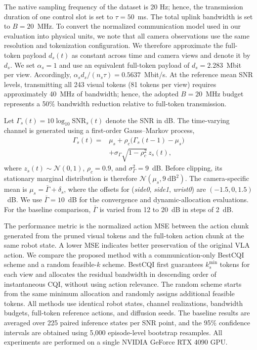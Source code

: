 \documentclass[lettersize,journal]{IEEEtran}
\theoremstyle{custom}
\begin{document}
The native sampling frequency of the dataset is 20 Hz; hence, the
transmission duration of one control slot is set to $\tau=50$~ms.
The total uplink bandwidth is set to $B=20$~MHz. To convert the normalized communication model used in our evaluation
into physical units, we note that all camera observations use the same
resolution and tokenization configuration. We therefore approximate
the full-token payload $d_s(t)$ as constant across time and camera
views and denote it by $d_s$. We set $\alpha_s=1$ and use an equivalent
full-token payload of $d_s=2.283$~Mbit per view. Accordingly,
$\alpha_s d_s/(n_s\tau)=0.5637$~Mbit/s. At the reference mean SNR
levels, transmitting all 243 visual tokens (81 tokens per view)
requires approximately 40~MHz of bandwidth; hence, the adopted
$B=20$~MHz budget represents a 50\% bandwidth reduction relative to
full-token transmission.

Let $\Gamma_s(t)=10\log_{10}\mathrm{SNR}_s(t)$ denote the SNR in dB.
The time-varying channel is generated using a first-order Gauss--Markov
process,
\begin{align}
\Gamma_s(t)
={}&\mu_s+\rho_c\bigl(\Gamma_s(t-1)-\mu_s\bigr)
\nonumber\\
&+\sigma_{\Gamma}\sqrt{1-\rho_c^2}\,z_s(t),
\label{eq:simulation_channel}
\end{align}
where $z_s(t)\sim\mathcal{N}(0,1)$, $\rho_c=0.9$, and
$\sigma_{\Gamma}^2 = 9$~dB. Before clipping, its stationary marginal
distribution is therefore
$\mathcal{N}(\mu_s,9~\mathrm{dB}^2)$. The camera-specific mean is
$\mu_s=\bar{\Gamma}+\delta_s$, where the offsets for
(\emph{side0}, \emph{side1}, \emph{wrist0}) are
$(-1.5,0,1.5)$~dB. We use $\bar{\Gamma}=10$~dB for the convergence
and dynamic-allocation evaluations. For the baseline comparison,
$\bar{\Gamma}$ is varied from 12 to 20~dB in steps of 2~dB.

The performance metric is the normalized action MSE between the action
chunk generated from the pruned visual tokens and the full-token action
chunk at the same robot state. A lower MSE indicates better preservation
of the original VLA action. We compare the proposed method with a
communication-only BestCQI scheme and a random feasible-$k$ scheme.
BestCQI first guarantees $k_s^{\min}$ tokens for each view and allocates
the residual bandwidth in descending order of instantaneous CQI,
without using action relevance. The random scheme starts from the same
minimum allocation and randomly assigns additional feasible tokens.
All methods use identical robot states, channel realizations, bandwidth
budgets, full-token reference actions, and diffusion seeds. The
baseline results are averaged over 225 paired inference states per SNR
point, and the 95\% confidence intervals are obtained using 5,000
episode-level bootstrap resamples. All experiments
are performed on a single NVIDIA GeForce RTX 4090 GPU.
\end{document}

